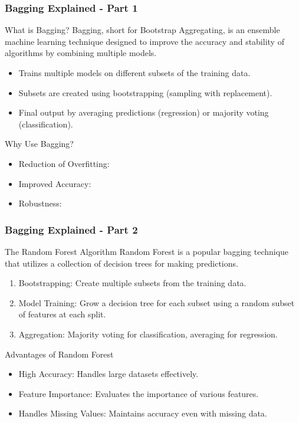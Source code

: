 \documentclass[aspectratio=169]{beamer}
\begin{document}
\begin{frame}[fragile]
    \frametitle{Bagging Explained - Part 1}
    \begin{block}{What is Bagging?}
        Bagging, short for Bootstrap Aggregating, is an ensemble machine learning technique designed to improve the accuracy and stability of algorithms by combining multiple models.
    \end{block}
    \begin{itemize}
        \item Trains multiple models on different subsets of the training data.
        \item Subsets are created using bootstrapping (sampling with replacement).
        \item Final output by averaging predictions (regression) or majority voting (classification).
    \end{itemize}
    
    \begin{block}{Why Use Bagging?}
        \begin{itemize}
            \item Reduction of Overfitting: 
            \item Improved Accuracy: 
            \item Robustness: 
        \end{itemize}
    \end{block}
\end{frame}

\begin{frame}[fragile]
    \frametitle{Bagging Explained - Part 2}
    \begin{block}{The Random Forest Algorithm}
        Random Forest is a popular bagging technique that utilizes a collection of decision trees for making predictions.
    \end{block}
    \begin{enumerate}
        \item Bootstrapping: Create multiple subsets from the training data.
        \item Model Training: Grow a decision tree for each subset using a random subset of features at each split.
        \item Aggregation: Majority voting for classification, averaging for regression.
    \end{enumerate}

    \begin{block}{Advantages of Random Forest}
        \begin{itemize}
            \item High Accuracy: Handles large datasets effectively.
            \item Feature Importance: Evaluates the importance of various features.
            \item Handles Missing Values: Maintains accuracy even with missing data.
        \end{itemize}
    \end{block}
\end{frame}
\end{document}
